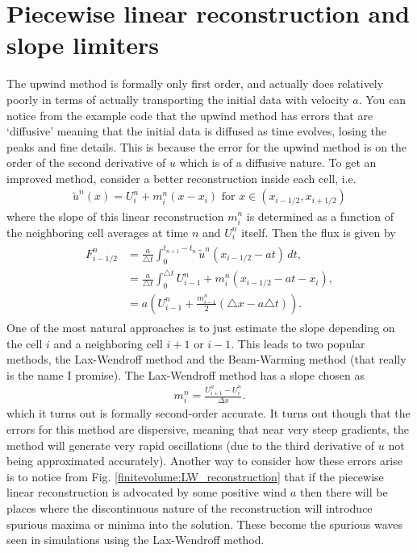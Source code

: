 \section*{Piecewise linear reconstruction and slope limiters}
The upwind method is formally only first order, and actually does relatively poorly in terms of actually transporting the initial data with velocity $a$.  You can notice from the example code that the upwind method has errors that are `diffusive' meaning that the initial data is diffused as time evolves, losing the peaks and fine details.  This is because the error for the upwind method is on the order of the second derivative of $u$ which is of a diffusive nature.  To get an improved method, consider a better reconstruction inside each cell, i.e.
\begin{gather}
\tilde{u}^n(x) = U_i^n + m_i^n(x-x_i) \mbox{ for } x \in (x_{i-1/2},x_{i+1/2})
\end{gather}
where the slope of this linear reconstruction $m_i^n$ is determined as a function of the neighboring cell averages at time $n$ and $U_i^n$ itself. 
Then the flux is given by  
\begin{align}
\begin{split}
F_{i-1/2}^n 
&= \frac{a}{\triangle t}\int_{0}^{t_{n+1}-t_n} \tilde{u}^n(x_{i-1/2}-at)\, dt  ,\\
&= \frac{a}{\triangle t}\int_{0}^{\triangle t} U_{i-1}^n + m_i^n(x_{i-1/2} - at - x_i), \\
&= a \left( U_{i-1}^n + \frac{m_{i-1}^n}{2} (\triangle x - a \triangle t)\right).
\end{split}
\end{align}
One of the most natural approaches is to just estimate the slope depending on the cell $i$ and a neighboring cell $i+1$ or $i-1$.  This leads to two popular methods, the Lax-Wendroff method and the Beam-Warming method (that really is the name I promise).  The Lax-Wendroff method has a slope chosen as
\begin{gather}
m_i^n = \frac{U^n_{i+1}-U_{i}^n}{\Delta x}.
\end{gather}
which it turns out is formally second-order accurate.  It turns out though that the errors for this method are dispersive, meaning that near very steep gradients, the method will generate very rapid oscillations (due to the third derivative of $u$ not being approximated accurately).  Another way to consider how these errors arise is to notice from Fig. \ref{finitevolume:LW_reconstruction} that if the piecewise linear reconstruction is advocated by some positive wind $a$ then there will be places where the discontinuous nature of the reconstruction will introduce spurious maxima or minima into the solution.  These become the spurious waves seen in simulations using the Lax-Wendroff method.

